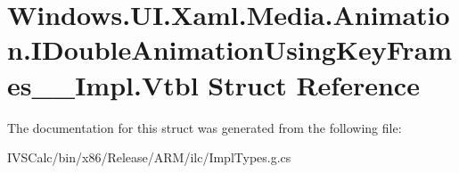 \hypertarget{struct_windows_1_1_u_i_1_1_xaml_1_1_media_1_1_animation_1_1_i_double_animation_using_key_frames_____impl_1_1_vtbl}{}\section{Windows.\+U\+I.\+Xaml.\+Media.\+Animation.\+I\+Double\+Animation\+Using\+Key\+Frames\+\_\+\+\_\+\+Impl.\+Vtbl Struct Reference}
\label{struct_windows_1_1_u_i_1_1_xaml_1_1_media_1_1_animation_1_1_i_double_animation_using_key_frames_____impl_1_1_vtbl}


The documentation for this struct was generated from the following file\+:\begin{DoxyCompactItemize}
\item 
I\+V\+S\+Calc/bin/x86/\+Release/\+A\+R\+M/ilc/Impl\+Types.\+g.\+cs\end{DoxyCompactItemize}
